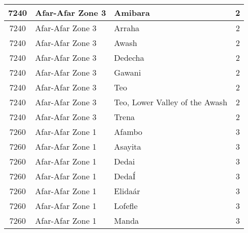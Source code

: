 \documentclass[12pt,a4paper]{report}
\begin{document}
\begin{tabular}{|c|l|l|c|}
\hline 
\rule[-1ex]{0pt}{2.5ex} 7240 & Afar-Afar Zone 3 & Amibara & 2 \\
\hline 
\rule[-1ex]{0pt}{2.5ex} 7240 & Afar-Afar Zone 3 & Arraha & 2 \\
\hline 
\rule[-1ex]{0pt}{2.5ex} 7240 & Afar-Afar Zone 3 & Awash & 2 \\
\hline 
\rule[-1ex]{0pt}{2.5ex} 7240 & Afar-Afar Zone 3 & Dedecha & 2 \\
\hline 
\rule[-1ex]{0pt}{2.5ex} 7240 & Afar-Afar Zone 3 & Gawani & 2 \\
\hline 
\rule[-1ex]{0pt}{2.5ex} 7240 & Afar-Afar Zone 3 & Teo & 2 \\
\hline 
\rule[-1ex]{0pt}{2.5ex} 7240 & Afar-Afar Zone 3 & Teo, Lower Valley of the Awash & 2 \\
\hline 
\rule[-1ex]{0pt}{2.5ex} 7240 & Afar-Afar Zone 3 & Trena & 2 \\
\hline 
\rule[-1ex]{0pt}{2.5ex} 7260 & Afar-Afar Zone 1 & Afambo & 3 \\
\hline 
\rule[-1ex]{0pt}{2.5ex} 7260 & Afar-Afar Zone 1 & Asayita & 3 \\
\hline 
\rule[-1ex]{0pt}{2.5ex} 7260 & Afar-Afar Zone 1 & Dedai & 3 \\
\hline 
\rule[-1ex]{0pt}{2.5ex} 7260 & Afar-Afar Zone 1 & Deda\'I & 3 \\
\hline 
\rule[-1ex]{0pt}{2.5ex} 7260 & Afar-Afar Zone 1 & Elida\'ar & 3 \\
\hline 
\rule[-1ex]{0pt}{2.5ex} 7260 & Afar-Afar Zone 1 & Lofefle & 3 \\
\hline 
\rule[-1ex]{0pt}{2.5ex} 7260 & Afar-Afar Zone 1 & Manda & 3 \\
\hline 
\end{tabular} 
\end{document}
